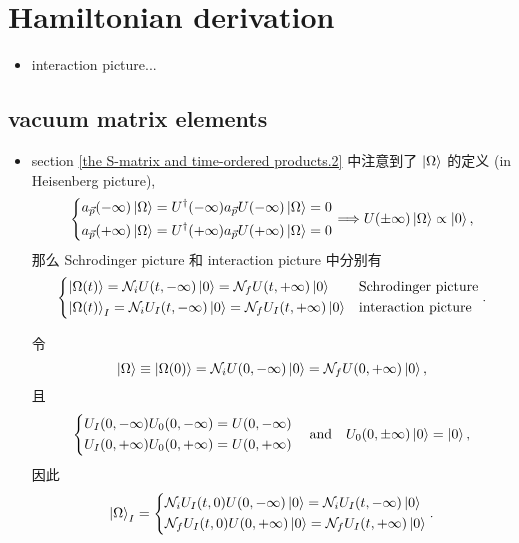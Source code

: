 \section{Hamiltonian derivation}
\begin{itemize}
	\item interaction picture...
\end{itemize}

\subsection{vacuum matrix elements} \label{subsection Feynman rules.2.1}
\begin{itemize}
	\item section \ref{the S-matrix and time-ordered products.2} 中注意到了 $\ket{\Omega}$ 的定义 (in Heisenberg picture),
	\begin{equation}
		\begin{dcases}
			a_{\vec{p}}(- \infty) \ket{\Omega} = U^\dag(- \infty) a_{\vec{p}} U(- \infty) \ket{\Omega} = 0 \\
			a_{\vec{p}}(+ \infty) \ket{\Omega} = U^\dag(+ \infty) a_{\vec{p}} U(+ \infty) \ket{\Omega} = 0
		\end{dcases} \Longrightarrow U(\pm \infty) \ket{\Omega} \propto \ket{0} ,
	\end{equation}
	那么 Schrodinger picture 和 interaction picture 中分别有
	\begin{equation}
		\begin{dcases}
			\ket{\Omega(t)} = \mathcal{N}_i U(t, - \infty) \ket{0} = \mathcal{N}_f U(t, + \infty) \ket{0} & \text{Schrodinger picture} \\
			\ket{\Omega(t)}_I = \mathcal{N}_i U_I(t, - \infty) \ket{0} = \mathcal{N}_f U_I(t, + \infty) \ket{0} & \text{interaction picture}
		\end{dcases}.
	\end{equation}
	
	\begin{tcolorbox}[title=calculation:]
		令
		\begin{equation}
			\ket{\Omega} \equiv \ket{\Omega(0)} = \mathcal{N}_i U(0, - \infty) \ket{0} = \mathcal{N}_f U(0, + \infty) \ket{0},
		\end{equation}
		且
		\begin{equation}
			\begin{dcases}
				U_I(0, - \infty) U_0(0, - \infty) = U(0, - \infty) \\
				U_I(0, + \infty) U_0(0, + \infty) = U(0, + \infty)
			\end{dcases} \quad \text{and} \quad U_0(0, \pm \infty) \ket{0} = \ket{0},
		\end{equation}
		因此
		\begin{equation}
			\ket{\Omega}_I = \begin{dcases}
				\mathcal{N}_i U_I(t, 0) U(0, - \infty) \ket{0} = \mathcal{N}_i U_I(t, - \infty) \ket{0} \\
				\mathcal{N}_f U_I(t, 0) U(0, + \infty) \ket{0} = \mathcal{N}_f U_I(t, + \infty) \ket{0}
			\end{dcases}.
		\end{equation}
	\end{tcolorbox}
	

\end{itemize}
